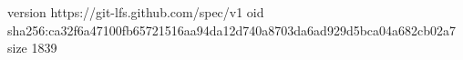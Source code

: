 version https://git-lfs.github.com/spec/v1
oid sha256:ca32f6a47100fb65721516aa94da12d740a8703da6ad929d5bca04a682cb02a7
size 1839
